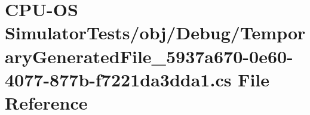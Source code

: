 \hypertarget{_c_p_u-_o_s_01_simulator_tests_2obj_2_debug_2_temporary_generated_file__5937a670-0e60-4077-877b-f7221da3dda1_8cs}{}\section{C\+P\+U-\/\+O\+S Simulator\+Tests/obj/\+Debug/\+Temporary\+Generated\+File\+\_\+5937a670-\/0e60-\/4077-\/877b-\/f7221da3dda1.cs File Reference}
\label{_c_p_u-_o_s_01_simulator_tests_2obj_2_debug_2_temporary_generated_file__5937a670-0e60-4077-877b-f7221da3dda1_8cs}
